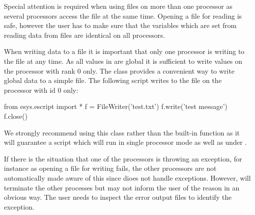 Special attention is required when using files on more than one processor as 
several processors access the file at the same time. Opening a file for
reading is safe, however the user has to make sure that the variables which are 
set from reading data from files are identical on all processors.

When writing data to a file it is important that only one processor is writing to
the file at any time. As all values in \escript are global it is sufficient
to write values on the processor with \MPI rank $0$ only. 
The  class provides a convenient way to write global data
to a simple file.  The following script writes to the file 
 on the processor with id $0$ only:
\begin{python}
from esys.escript import *
f = FileWriter('test.txt')
f.write('test message')
f.close()
\end{python}
We strongly recommend using this class rather than the built-in 
function as it will guarantee a script which will run in single processor mode as well as under \MPI.

If there is the situation that one of the processors is throwing an exception, 
for instance as opening a file for writing fails, the other processors 
are not automatically made aware of this since \MPI
dioes not handle exceptions.
However, \MPI will terminate the other processes but 
may not inform the user of the reason in an obvious way. The user needs to inspect the
error output files to identify the exception.
